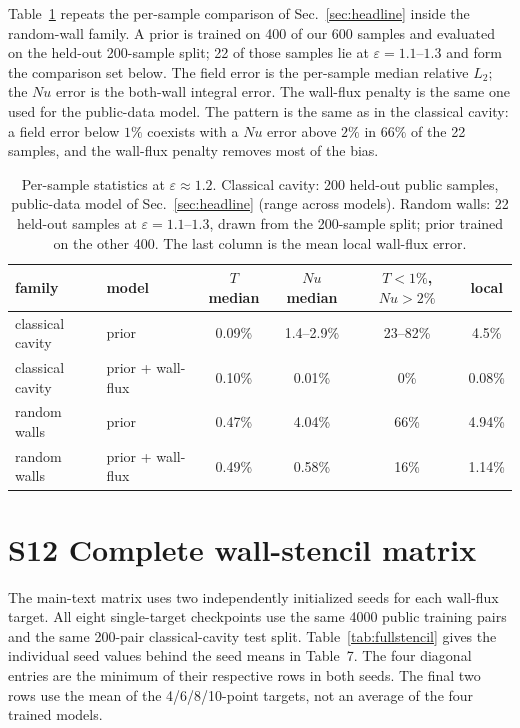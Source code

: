 \documentclass[preprint,11pt,a4paper,times]{elsarticle}
\begin{document}
Table~\ref{tab:ownfieldnu} repeats the per-sample comparison of Sec.~\ref{sec:headline} inside
the random-wall family. A prior is trained on 400 of our 600 samples and evaluated on the
held-out 200-sample split; 22 of those samples lie at $\varepsilon=1.1$--$1.3$ and form the
comparison set below. The field error is the per-sample median relative $L_2$; the $Nu$ error is
the both-wall integral error. The wall-flux penalty is the same one used for the public-data
model. The pattern is the same as in the classical cavity: a field error below $1\%$ coexists
with a $Nu$ error above $2\%$ in $66\%$ of the 22 samples, and the wall-flux penalty removes
most of the bias.

\begin{table}[htbp]
\centering
\footnotesize
\setlength{\tabcolsep}{4pt}
\caption{Per-sample statistics at $\varepsilon\approx1.2$. Classical cavity: 200
held-out public samples, public-data model of Sec.~\ref{sec:headline} (range across models).
Random walls: 22 held-out samples at $\varepsilon=1.1$--$1.3$, drawn from the 200-sample
split; prior trained on the other 400. The last column is the mean local wall-flux error.}
\label{tab:ownfieldnu}
\begin{tabular}{@{}llcccc@{}}
\toprule
family & model & $T$ median & $Nu$ median & $T<1\%$, $Nu>2\%$ & local\\
\midrule
classical cavity & prior & 0.09\% & 1.4--2.9\% & 23--82\% & 4.5\%\\
classical cavity & prior + wall-flux & 0.10\% & 0.01\% & 0\% & 0.08\%\\
random walls & prior & 0.47\% & 4.04\% & 66\% & 4.94\%\\
random walls & prior + wall-flux & 0.49\% & 0.58\% & 16\% & 1.14\%\\
\bottomrule
\end{tabular}
\end{table}

\section*{S12 Complete wall-stencil matrix}

The main-text matrix uses two independently initialized seeds for each wall-flux target.
All eight single-target checkpoints use the same 4000 public training pairs and the same
200-pair classical-cavity test split. Table~\ref{tab:fullstencil} gives the individual seed
values behind the seed means in Table~7. The four diagonal entries are the minimum of their
respective rows in both seeds. The final two rows use the mean of the 4/6/8/10-point targets,
not an average of the four trained models.
\end{document}
